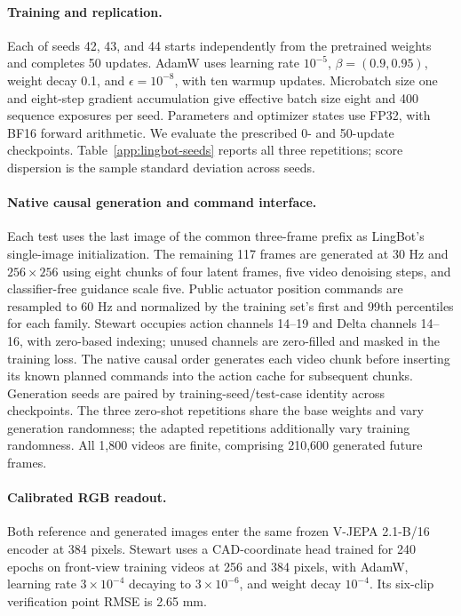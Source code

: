 \paragraph{Training and replication.}
Each of seeds 42, 43, and 44 starts independently from the pretrained weights and completes 50 updates. AdamW uses learning rate $10^{-5}$, $\beta=(0.9,0.95)$, weight decay 0.1, and $\epsilon=10^{-8}$, with ten warmup updates. Microbatch size one and eight-step gradient accumulation give effective batch size eight and 400 sequence exposures per seed. Parameters and optimizer states use FP32, with BF16 forward arithmetic. We evaluate the prescribed 0- and 50-update checkpoints. Table~\ref{app:lingbot-seeds} reports all three repetitions; score dispersion is the sample standard deviation across seeds.

\paragraph{Native causal generation and command interface.}
Each test uses the last image of the common three-frame prefix as LingBot's single-image initialization. The remaining 117 frames are generated at 30 Hz and $256\times256$ using eight chunks of four latent frames, five video denoising steps, and classifier-free guidance scale five. Public actuator position commands are resampled to 60 Hz and normalized by the training set's first and 99th percentiles for each family. Stewart occupies action channels 14--19 and Delta channels 14--16, with zero-based indexing; unused channels are zero-filled and masked in the training loss. The native causal order generates each video chunk before inserting its known planned commands into the action cache for subsequent chunks. Generation seeds are paired by training-seed/test-case identity across checkpoints. The three zero-shot repetitions share the base weights and vary generation randomness; the adapted repetitions additionally vary training randomness. All 1,800 videos are finite, comprising 210,600 generated future frames.

\paragraph{Calibrated RGB readout.}
Both reference and generated images enter the same frozen V-JEPA 2.1-B/16 encoder at 384 pixels. Stewart uses a CAD-coordinate head trained for 240 epochs on front-view training videos at 256 and 384 pixels, with AdamW, learning rate $3\times10^{-4}$ decaying to $3\times10^{-6}$, and weight decay $10^{-4}$. Its six-clip verification point RMSE is 2.65 mm.

